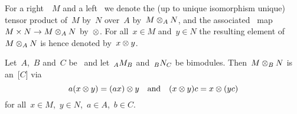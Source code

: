 \begin{notationnonum}
  For a right~{}~$M$ and a left~{} we denote the (up to unique isomorphism unique) tensor product of~$M$ by~$N$ over~$A$ by~$M \otimes_A N$, and the associated~{} map~$M \times N \to M \otimes_A N$ by~$\otimes$.
  For all~$x \in M$ and~$y \in N$ the resulting element of~$M \otimes_A N$ is hence denoted by~$x \otimes y$.
\end{notationnonum}


\begin{lemma}
  Let~$A$,~$B$ and~$C$ be~{\kalgs} and let~$\indmodule[A]{M}[B]$ and~$\indmodule[B]{N}[C]$ be bimodules.
  Then~$M \otimes_B N$ is an~{[$C$]} via
  \[
      a (x \otimes y)
    = (ax) \otimes y
    \quad\text{and}\quad
      (x \otimes y) c
    = x \otimes (yc)
  \]
  for all~$x \in M$,~$y \in N$,~$a \in A$,~$b \in C$.
\end{lemma}


